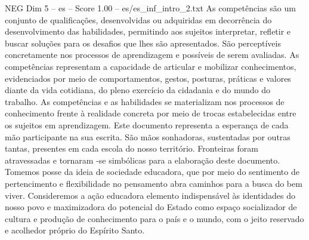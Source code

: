 \begin{textsample}{NEG Dim 5 – es – Score 1.00 – es/es\_inf\_intro\_2.txt}
As competências são um conjunto de qualificações, desenvolvidas ou adquiridas em decorrência do desenvolvimento das habilidades, permitindo aos sujeitos interpretar, refletir e buscar soluções para os desafios que lhes são apresentados.
São perceptíveis concretamente nos processos de aprendizagem e possíveis de serem avaliadas.
As competências representam a capacidade de articular e mobilizar conhecimentos, evidenciados por meio de comportamentos, gestos, posturas, práticas e valores diante da vida cotidiana, do pleno exercício da cidadania e do mundo do trabalho.
As competências e as habilidades se materializam nos processos de conhecimento frente à realidade concreta por meio de trocas estabelecidas entre os sujeitos em aprendizagem.
Este documento representa a esperança de cada mão participante na sua escrita.
São mãos sonhadoras, sustentadas por outras tantas, presentes em cada escola do nosso território.
Fronteiras foram atravessadas e tornaram -se simbólicas para a elaboração deste documento.
Tomemos posse da ideia de sociedade educadora, que por meio do sentimento de pertencimento e flexibilidade no pensamento abra caminhos para a busca do bem viver.
Consideremos a ação educadora elemento indispensável às identidades do nosso povo e maximizadora do potencial do Estado como espaço socializador de cultura e produção de conhecimento para o país e o mundo, com o jeito reservado e acolhedor próprio do Espírito Santo.

\end{textsample}
